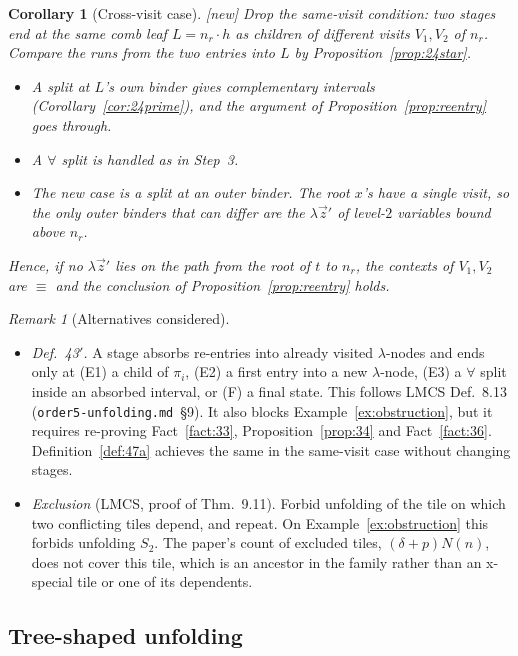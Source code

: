 \documentclass[11pt]{article}
\newcommand{\suc}[2]{#1{\cdot}#2}
\newcommand{\New}{\textsf{[new]}}
\theoremstyle{plain}
\newtheorem{corollary}[theorem]{Corollary}
\theoremstyle{definition}
\theoremstyle{remark}
\newtheorem{remark}[theorem]{Remark}
\begin{document}
\begin{corollary}[Cross-visit case]\label{cor:crossvisit}
\New{} Drop the same-visit condition: two stages end at the same comb
leaf $L=\suc{n_r}h$ as children of different visits $V_1,V_2$ of $n_r$.
Compare the runs from the two entries into $L$ by
Proposition~\ref{prop:24star}.
\begin{itemize}
\item A split at $L$'s own binder gives complementary intervals
  (Corollary~\ref{cor:24prime}), and the argument of
  Proposition~\ref{prop:reentry} goes through.
\item A $\forall$ split is handled as in Step~3.
\item The new case is a split at an outer binder.  The
  root $x$'s have a single visit, so the only outer binders that can
  differ are the $\lambda\vec z'$ of level-$2$ variables bound above
  $n_r$.
\end{itemize}
Hence, if no $\lambda\vec z'$ lies on the path from the root of $t$ to
$n_r$, the contexts of $V_1,V_2$ are $\equiv$ and the conclusion of
Proposition~\ref{prop:reentry} holds.
\end{corollary}

\begin{remark}[Alternatives considered]
\begin{itemize}
\item \emph{Def.~43$'$.} A stage absorbs re-entries into already visited
  $\lambda$-nodes and ends only at (E1) a child of $\pi_i$, (E2) a
  first entry into a new $\lambda$-node, (E3) a $\forall$ split inside
  an absorbed interval, or (F) a final state.  This follows LMCS
  Def.~8.13 (\texttt{order5-unfolding.md}~\S9).  It also blocks
  Example~\ref{ex:obstruction}, but it requires re-proving
  Fact~\ref{fact:33}, Proposition~\ref{prop:34} and Fact~\ref{fact:36}.
  Definition~\ref{def:47a} achieves the same in the same-visit case
  without changing stages.
\item \emph{Exclusion} (LMCS, proof of Thm.~9.11).  Forbid unfolding of
  the tile on which two conflicting tiles depend, and repeat.  On
  Example~\ref{ex:obstruction} this forbids unfolding $S_2$.  The
  paper's count of excluded tiles, $(\delta+p)N(n)$, does not cover this
  tile, which is an ancestor in the family rather than an x-special
  tile or one of its dependents.
\end{itemize}
\end{remark}

\subsection{Tree-shaped unfolding}\label{sec:treeunf}
\end{document}
